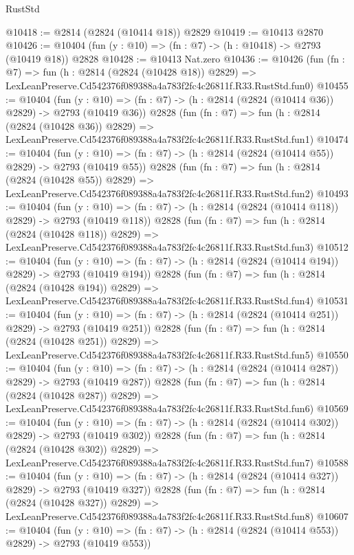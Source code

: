 \begin{lexlean}{RustStd}
\begin{coremodule}
@10418 := @2814 (@2824 (@10414 @18)) @2829
@10419 := @10413 @2870
@10426 := @10404 (fun (y : @10) => (fn : @7) -> (h : @10418) -> @2793 (@10419 @18)) @2828
@10428 := @10413 Nat.zero
@10436 := @10426
    (fun (fn : @7) =>
    fun (h : @2814 (@2824 (@10428 @18)) @2829) =>
    LexLeanPreserve.Cd542376f089388a4a783f2fc4c26811f.R33.RustStd.fun0)
@10455 := @10404
    (fun (y : @10) => (fn : @7) -> (h : @2814 (@2824 (@10414 @36)) @2829) -> @2793 (@10419 @36))
    @2828
    (fun (fn : @7) =>
    fun (h : @2814 (@2824 (@10428 @36)) @2829) =>
    LexLeanPreserve.Cd542376f089388a4a783f2fc4c26811f.R33.RustStd.fun1)
@10474 := @10404
    (fun (y : @10) => (fn : @7) -> (h : @2814 (@2824 (@10414 @55)) @2829) -> @2793 (@10419 @55))
    @2828
    (fun (fn : @7) =>
    fun (h : @2814 (@2824 (@10428 @55)) @2829) =>
    LexLeanPreserve.Cd542376f089388a4a783f2fc4c26811f.R33.RustStd.fun2)
@10493 := @10404
    (fun (y : @10) => (fn : @7) -> (h : @2814 (@2824 (@10414 @118)) @2829) -> @2793 (@10419 @118))
    @2828
    (fun (fn : @7) =>
    fun (h : @2814 (@2824 (@10428 @118)) @2829) =>
    LexLeanPreserve.Cd542376f089388a4a783f2fc4c26811f.R33.RustStd.fun3)
@10512 := @10404
    (fun (y : @10) => (fn : @7) -> (h : @2814 (@2824 (@10414 @194)) @2829) -> @2793 (@10419 @194))
    @2828
    (fun (fn : @7) =>
    fun (h : @2814 (@2824 (@10428 @194)) @2829) =>
    LexLeanPreserve.Cd542376f089388a4a783f2fc4c26811f.R33.RustStd.fun4)
@10531 := @10404
    (fun (y : @10) => (fn : @7) -> (h : @2814 (@2824 (@10414 @251)) @2829) -> @2793 (@10419 @251))
    @2828
    (fun (fn : @7) =>
    fun (h : @2814 (@2824 (@10428 @251)) @2829) =>
    LexLeanPreserve.Cd542376f089388a4a783f2fc4c26811f.R33.RustStd.fun5)
@10550 := @10404
    (fun (y : @10) => (fn : @7) -> (h : @2814 (@2824 (@10414 @287)) @2829) -> @2793 (@10419 @287))
    @2828
    (fun (fn : @7) =>
    fun (h : @2814 (@2824 (@10428 @287)) @2829) =>
    LexLeanPreserve.Cd542376f089388a4a783f2fc4c26811f.R33.RustStd.fun6)
@10569 := @10404
    (fun (y : @10) => (fn : @7) -> (h : @2814 (@2824 (@10414 @302)) @2829) -> @2793 (@10419 @302))
    @2828
    (fun (fn : @7) =>
    fun (h : @2814 (@2824 (@10428 @302)) @2829) =>
    LexLeanPreserve.Cd542376f089388a4a783f2fc4c26811f.R33.RustStd.fun7)
@10588 := @10404
    (fun (y : @10) => (fn : @7) -> (h : @2814 (@2824 (@10414 @327)) @2829) -> @2793 (@10419 @327))
    @2828
    (fun (fn : @7) =>
    fun (h : @2814 (@2824 (@10428 @327)) @2829) =>
    LexLeanPreserve.Cd542376f089388a4a783f2fc4c26811f.R33.RustStd.fun8)
@10607 := @10404
    (fun (y : @10) => (fn : @7) -> (h : @2814 (@2824 (@10414 @553)) @2829) -> @2793 (@10419 @553))

\end{coremodule}
\end{lexlean}

